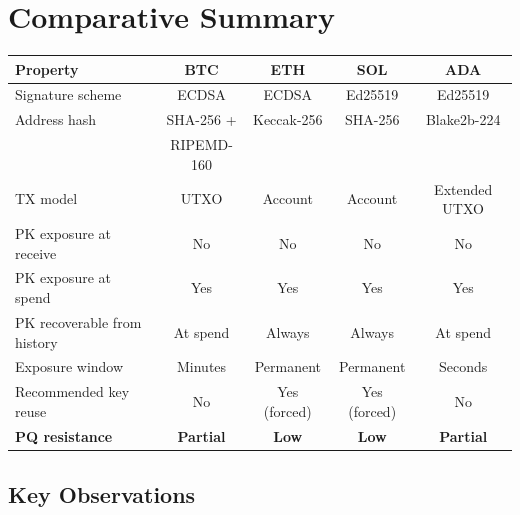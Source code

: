 \documentclass[11pt,a4paper]{article}
\begin{document}
\section{Comparative Summary}

\begin{center}
\begin{tabular}{lcccc}
\toprule
\textbf{Property} & \textbf{BTC} & \textbf{ETH} & \textbf{SOL} &
  \textbf{ADA} \\
\midrule
Signature scheme & ECDSA & ECDSA & Ed25519 & Ed25519 \\
Address hash & SHA-256 + & Keccak-256 & SHA-256 & Blake2b-224 \\
 & RIPEMD-160 & & & \\
TX model & UTXO & Account & Account & Extended UTXO \\
PK exposure at receive & No & No & No & No \\
PK exposure at spend & Yes & Yes & Yes & Yes \\
PK recoverable from history & At spend & Always & Always & At spend \\
Exposure window & Minutes & Permanent & Permanent & Seconds \\
Recommended key reuse & No & Yes (forced) & Yes (forced) & No \\
\midrule
\textbf{PQ resistance} & \textbf{Partial} & \textbf{Low} &
  \textbf{Low} & \textbf{Partial} \\
\bottomrule
\end{tabular}
\end{center}

\subsection{Key Observations}
\end{document}
